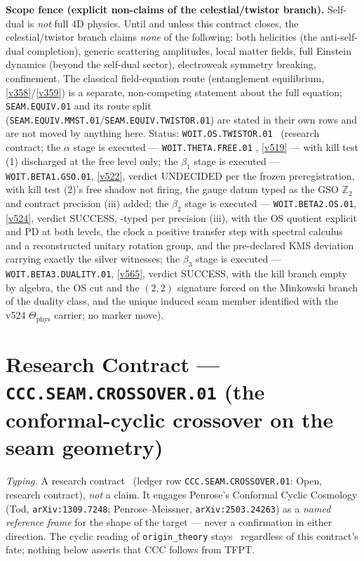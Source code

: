 \documentclass[11pt,a4paper]{article}
\newcommand{\Z}{\mathbb Z}
\begin{document}
\par\smallskip\noindent\textbf{Scope fence (explicit non-claims of the celestial/twistor branch).}
Self-dual is \emph{not} full 4D physics. Until and unless this contract closes, the celestial/twistor
branch claims \emph{none} of the following: both helicities (the anti-self-dual completion), generic
scattering amplitudes, local matter fields, full Einstein dynamics (beyond the self-dual sector),
electroweak symmetry breaking, confinement. The classical field-equation route (entanglement
equilibrium, \vref{v358}/\vref{v359}) is a separate, non-competing statement about the full equation;
\texttt{SEAM.EQUIV.01} and its route split (\texttt{SEAM.EQUIV.MMST.01}/\texttt{SEAM.EQUIV.TWISTOR.01})
are stated in their own rows and are not moved by anything here. Status:
\texttt{WOIT.OS.TWISTOR.01} \mO\ (research contract; the $\alpha$ stage is executed ---
\texttt{WOIT.THETA.FREE.01} \mE, \vref{v519} --- with kill test (1) discharged at the free level
only; the $\beta_1$ stage is executed --- \texttt{WOIT.BETA1.GSO.01}, \vref{v522}, verdict
UNDECIDED per the frozen preregistration, with kill test (2)'s free shadow not firing, the
gauge datum typed as the GSO $\Z_2$ and contract precision (iii) added; the $\beta_2$ stage
is executed --- \texttt{WOIT.BETA2.OS.01}, \vref{v524}, verdict SUCCESS, \mC-typed per
precision (iii), with the OS quotient explicit and PD at both levels, the clock a positive
transfer step with spectral calculus and a reconstructed unitary rotation group, and the
pre-declared KMS deviation carrying exactly the silver witnesses; the $\beta_3$ stage is
executed --- \texttt{WOIT.BETA3.DUALITY.01}, \vref{v565}, verdict SUCCESS, with the kill
branch empty by algebra, the OS cut and the $(2,2)$ signature forced on the Minkowski branch
of the duality class, and the unique induced seam member identified with the v524
$\Theta_{\mathrm{phys}}$ carrier; no marker move).


\section*{Research Contract --- \texttt{CCC.SEAM.CROSSOVER.01} (the conformal-cyclic crossover on the seam geometry)}
\noindent\emph{Typing.} A research contract \mO\ (ledger row \texttt{CCC.SEAM.CROSSOVER.01}:
Open, research contract), \emph{not} a claim.  It engages Penrose's Conformal Cyclic Cosmology
(Tod, \texttt{arXiv:1309.7248}; Penrose--Meissner, \texttt{arXiv:2503.24263}) as a \emph{named
reference frame} for the shape of the target --- never a confirmation in either direction.  The
cyclic reading of \texttt{origin\_theory} stays \mC\ regardless of this contract's fate; nothing
below asserts that CCC follows from TFPT.
\end{document}
